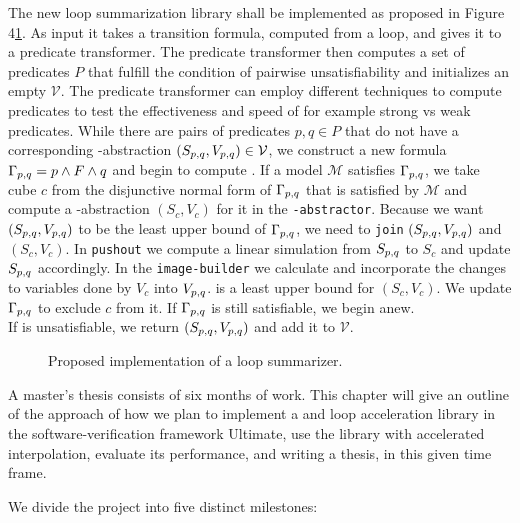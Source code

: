 
The new \qvasrs loop summarization library shall be implemented as proposed in Figure 4\ref{fig}. As input it takes a transition formula, computed from a loop, and gives it to a predicate transformer. The predicate transformer then computes a set of predicates $P$ that fulfill the condition of pairwise unsatisfiability and initializes an empty \qvasrs $\mathcal{V}$. The predicate transformer can employ different techniques to compute predicates to test the effectiveness and speed of for example strong vs weak predicates. While there are pairs of predicates $p, q \in P$ that do not have a corresponding \qvasr-abstraction $(S_{p, q}, V_{p, q}) \in \mathcal{V}$, we construct a new formula $\Gamma_{p, q} = p\land F \land q$ and begin to compute \pqvasr. If a model $\mathcal{M}$ satisfies $\Gamma_{p, q}$, we take cube $c$ from the disjunctive normal form of $\Gamma_{p, q}$ that is satisfied by $\mathcal{M}$ and compute a \qvasr-abstraction $(S_c, V_c)$ for it in the \texttt{\qvasr-abstractor}. Because we want $(S_{p, q}, V_{p, q})$ to be the least upper bound of $\Gamma_{p, q}$, we need to \texttt{join} $(S_{p, q}, V_{p, q})$ and $(S_c, V_c)$. In \texttt{pushout} we compute a linear simulation from $S_{p, q}$ to $S_c$ and update $S_{p, q}$ accordingly. In the \texttt{image-builder} we calculate and incorporate the changes to variables done by $V_c$ into $V_{p, q}$. \pqvasr is a least upper bound for $(S_c, V_c)$. We update $\Gamma_{p, q}$ to exclude $c$ from it. If $\Gamma_{p, q}$ is still satisfiable, we begin anew. \\
If \pqformula is unsatisfiable, we return $(S_{p, q}, V_{p, q})$ and add it to $\mathcal{V}$.
\begin{figure}[H]
    
    \caption{Proposed implementation of a \qvasrs loop summarizer.}
    \label{fig}
\end{figure}

A master's thesis consists of six months of work. This chapter will give an outline of the approach of how we plan to implement a \qvasr and \qvasrs loop acceleration library in the software-verification framework Ultimate, use the library with accelerated interpolation, evaluate its performance, and writing a thesis, in this given time frame. \\ \par
We divide the project into five distinct milestones:

